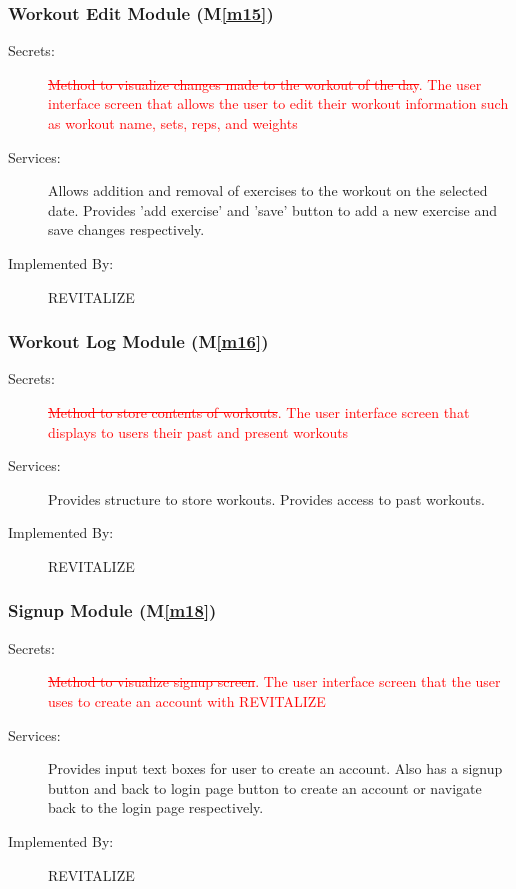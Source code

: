 \documentclass[12pt, titlepage]{article}
\newcommand{\mref}[1]{M\ref{#1}}
\begin{document}
\subsubsection{Workout Edit Module (\mref{m15})}
\begin{description}
	\item[Secrets:]\textcolor{red}{\sout{Method to visualize changes made to the workout of the day}}\textcolor{red}{. The user interface screen that allows the user to edit their workout information such as workout name, sets, reps, and weights}
	\item[Services:]Allows addition and removal of exercises to the workout on the selected date. Provides 'add exercise' and 'save' button to add a new exercise and save changes respectively.
	\item[Implemented By:] REVITALIZE
\end{description}

\subsubsection{Workout Log Module (\mref{m16})}
\begin{description}
	\item[Secrets:]\textcolor{red}{\sout{Method to store contents of workouts}}\textcolor{red}{. The user interface screen that displays to users their past and present workouts}
	\item[Services:]Provides structure to store workouts. Provides access to past workouts.
	\item[Implemented By:] REVITALIZE
\end{description}

\subsubsection{Signup Module (\mref{m18})}
\begin{description}
	\item[Secrets:]\textcolor{red}{\sout{Method to visualize signup screen}}\textcolor{red}{. The user interface screen that the user uses to create an account with REVITALIZE} 
	\item[Services:]Provides input text boxes for user to create an account. Also has a signup button and back to login page button to create an account or navigate back to the login page respectively.
	\item[Implemented By:] REVITALIZE
\end{description}
\end{document}
